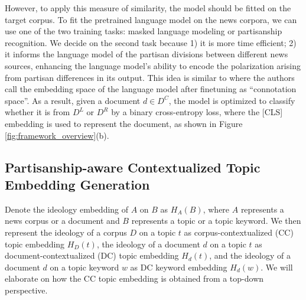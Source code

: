 \documentclass[11pt]{article}
\begin{document}
However, to apply this measure of similarity, the model should be fitted on the target corpus. To fit the pretrained language model on the news corpora, we can use one of the two training tasks: masked language modeling or partisanship recognition. We decide on the second task because 1) it is more time efficient; 2) it informs the language model of the partisan divisions between different news sources, enhancing the language model's ability to encode the polarization arising from partisan differences in its output. This idea is similar to \cite{webson2020undocumented} where the authors call the embedding space of the language model after finetuning as ``connotation space''.
As a result, given a document $d \in D^C$, the model is optimized to classify whether it is from $D^L$ or $D^R$ by a binary cross-entropy loss, where the [CLS] embedding is used to represent the document, as shown in Figure \ref{fig:framework_overview}(b).

\subsection{Partisanship-aware Contextualized Topic Embedding Generation}
\label{sec:emb-gene}
Denote the ideology embedding of $A$ on $B$ as $H_A(B)$, where $A$ represents a news corpus or a document and $B$ represents a topic or a topic keyword.
We then represent the ideology of a corpus $D$ on a topic $t$ as corpus-contextualized (CC) topic embedding $H_D(t)$, the ideology of a document $d$ on a topic $t$ as document-contextualized (DC) topic embedding $H_d(t)$, and the ideology of a document $d$ on a topic keyword $w$ as DC keyword embedding $H_d(w)$. We will elaborate on how the CC topic embedding is obtained from a top-down perspective.
\end{document}
